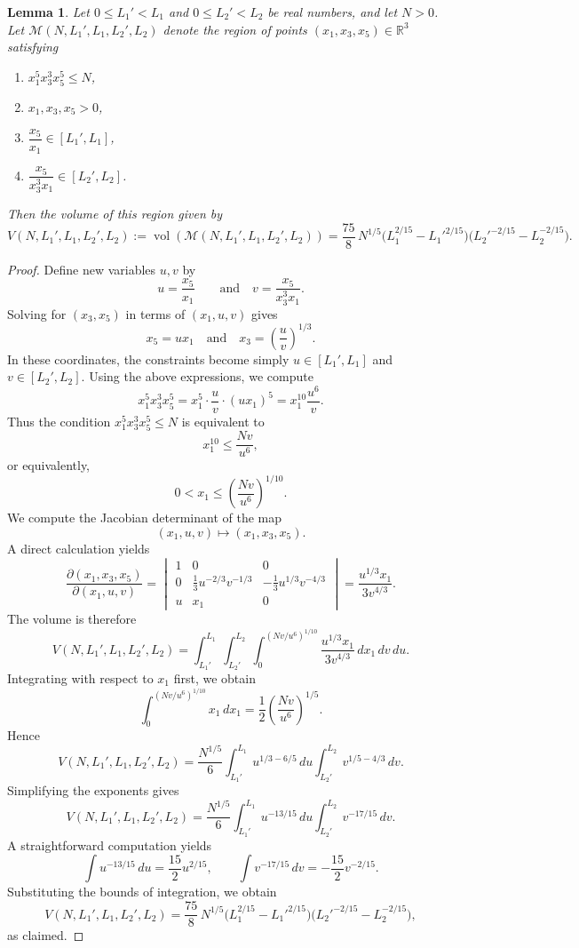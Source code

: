 \documentclass[table]{amsart}
\newtheorem{lemma}[theorem]{Lemma}
\newcommand{\op}[1]{\operatorname{#1}}
\numberwithin{equation}{section}
\begin{document}
\begin{lemma}
Let $0\le L_1'<L_1$ and $0\le L_2'<L_2$ be real numbers, and let $N>0$.   
Let $\mathcal{M}(N,L_1',L_1,L_2',L_2)$ denote the region of points
$(x_1,x_3,x_5)\in\mathbb{R}^3$ satisfying
\begin{enumerate}
    \item $x_1^5 x_3^3 x_5^5 \le N$,
    \item $x_1,x_3,x_5>0$,
    \item $\dfrac{x_5}{x_1}\in[L_1',L_1]$,
    \item $\dfrac{x_5}{x_3^3 x_1}\in[L_2',L_2]$.
\end{enumerate}
Then the volume of this region given by
\[
V(N,L_1',L_1,L_2',L_2)
:=\op{vol}\left(\mathcal{M}(N,L_1',L_1,L_2',L_2)\right)=
\frac{75}{8}\,N^{1/5}
\bigl(L_1^{2/15}-L_1'^{2/15}\bigr)
\bigl(L_2'^{-2/15}-L_2^{-2/15}\bigr).
\]
\end{lemma}

\begin{proof}
Define new variables $u,v$ by
\[
u=\frac{x_5}{x_1} \qquad \text{and}\quad v=\frac{x_5}{x_3^3 x_1}.
\]
Solving for $(x_3,x_5)$ in terms of $(x_1,u,v)$ gives
\[
x_5=u x_1 \quad \text{and}\quad x_3=\left(\frac{u}{v}\right)^{1/3}.
\]
In these coordinates, the constraints become simply $u\in[L_1',L_1]$ and $v\in[L_2',L_2]$. Using the above expressions, we compute
\[
x_1^5 x_3^3 x_5^5
=
x_1^5 \cdot \frac{u}{v} \cdot (u x_1)^5
=
x_1^{10}\frac{u^6}{v}.
\]
Thus the condition $x_1^5 x_3^3 x_5^5\le N$ is equivalent to
\[
x_1^{10}\le \frac{Nv}{u^6},
\]
or equivalently,
\[
0<x_1\le \left(\frac{Nv}{u^6}\right)^{1/10}.
\]
\noindent We compute the Jacobian determinant of the map
\[
(x_1,u,v)\longmapsto (x_1,x_3,x_5).
\]
A direct calculation yields
\[
\frac{\partial(x_1,x_3,x_5)}{\partial(x_1,u,v)}
=
\begin{vmatrix}
1 & 0 & 0 \\[8pt]
0 & \frac{1}{3}u^{-2/3}v^{-1/3} & -\frac{1}{3}u^{1/3}v^{-4/3} \\[8pt]
u & x_1 & 0
\end{vmatrix}
=
\frac{u^{1/3}x_1}{3v^{4/3}}.
\]
The volume is therefore
\[
V(N,L_1',L_1,L_2',L_2)
=
\int_{L_1'}^{L_1}
\int_{L_2'}^{L_2}
\int_{0}^{(Nv/u^6)^{1/10}}
\frac{u^{1/3}x_1}{3v^{4/3}}
\,dx_1\,dv\,du.
\]
Integrating with respect to $x_1$ first, we obtain
\[
\int_0^{(Nv/u^6)^{1/10}} x_1\,dx_1
=
\frac12\left(\frac{Nv}{u^6}\right)^{1/5}.
\]
Hence
\[
V(N,L_1',L_1,L_2',L_2)
=
\frac{N^{1/5}}{6}
\int_{L_1'}^{L_1} u^{1/3-6/5}\,du
\int_{L_2'}^{L_2} v^{1/5-4/3}\,dv.
\]
Simplifying the exponents gives
\[
V(N,L_1',L_1,L_2',L_2)
=
\frac{N^{1/5}}{6}
\int_{L_1'}^{L_1} u^{-13/15}\,du
\int_{L_2'}^{L_2} v^{-17/15}\,dv.
\]
A straightforward computation yields
\[
\int u^{-13/15}\,du=\frac{15}{2}u^{2/15},
\qquad
\int v^{-17/15}\,dv=-\frac{15}{2}v^{-2/15}.
\]
Substituting the bounds of integration, we obtain
\[
V(N,L_1',L_1,L_2',L_2)
=
\frac{75}{8}\,N^{1/5}
\bigl(L_1^{2/15}-L_1'^{2/15}\bigr)
\bigl(L_2'^{-2/15}-L_2^{-2/15}\bigr),
\]
as claimed.
\end{proof}
\end{document}
